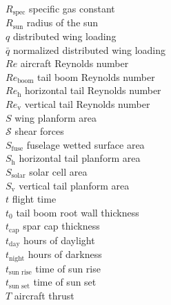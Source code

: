 \begin{multicols}{2}
\begin{tabbing}
$R_{\text{spec}}$ \> specific gas constant \\ %
$R_{\text{sun}}$ \> radius of the sun \\
$q$ \> distributed wing loading \\ %
$\bar{q}$ \> normalized distributed wing loading \\
$Re$ \> aircraft Reynolds number \\
$Re_{\text{boom}}$ \> tail boom Reynolds number \\
$Re_{\text{h}}$ \> horizontal tail Reynolds number \\
$Re_{\text{v}}$ \> vertical tail Reynolds number \\
$S$ \> wing planform area \\ %
$\mathcal{S}$ \> shear forces \\ %
$S_{\text{fuse}}$ \> fuselage wetted surface area \\ %
$S_{\text{h}}$ \> horizontal tail planform area \\ %
$S_{\text{solar}}$ \> solar cell area \\ %
$S_{\text{v}}$ \> vertical tail planform area \\ %
$t$ \> flight time \\ %
$t_0$ \> tail boom root wall thickness \\ %
$t_{\text{cap}}$ \> spar cap thickness \\ %
$t_{\text{day}}$ \> hours of daylight \\ %
$t_{\text{night}}$ \> hours of darkness \\ %
$t_{\text{sun rise}}$ \> time of sun rise \\ %
$t_{\text{sun set}}$ \> time of sun set \\ %
$T$ \> aircraft thrust \\ %

\end{tabbing}
\end{multicols}
